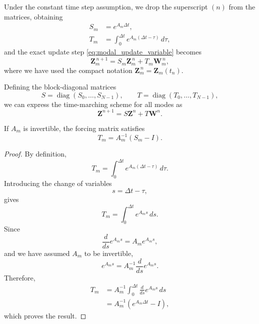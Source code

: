 \documentclass{Configuration_Files/PoliMi3i_thesis}
\begin{document}
Under the constant time step assumption, we drop the superscript $(n)$ from the matrices, obtaining
\begin{align}
S_m
&=
e^{A_m\Delta t}, \label{eq:Sm_def}
\\
T_m
&=
\int_0^{\Delta t}
e^{A_m(\Delta t-\tau)}
\,d\tau, \label{eq:Tm_def}
\end{align}
and the exact update step \eqref{eq:modal_update_variable} becomes
\begin{equation} \label{eq:modal_update}
\mathbf Z_m^{\,n+1}
=
S_m
\mathbf Z_m^{\,n}
+
T_m
\mathbf W_m^{\,n},
\end{equation}
where we have used the compact notation $\mathbf Z_m^{\,n} = \mathbf Z_m(t_n)$.

Defining the block-diagonal matrices
\begin{equation*}
S
=
\operatorname{diag}
(S_0,\ldots,S_{N-1}),
\qquad
T
=
\operatorname{diag}
(T_0,\ldots,T_{N-1}),
\end{equation*}
we can express the time-marching scheme for all modes as
\begin{equation} \label{eq:all_modal_update}
\mathbf Z^{n+1}
=
S\mathbf Z^n
+
T\mathbf W^n.
\end{equation}

\begin{proposition} \label{prop:Tmatrix}
If $A_m$ is invertible, the forcing matrix satisfies
\begin{equation*}
T_m
=
A_m^{-1}(S_m-I).
\end{equation*}
\end{proposition}

\begin{proof}
By definition,
\begin{equation*}
T_m
=
\int_0^{\Delta t}
e^{A_m(\Delta t-\tau)}
\,d\tau.
\end{equation*}
Introducing the change of variables
\begin{equation*}
s=\Delta t-\tau,
\end{equation*}
gives
\begin{equation*}
T_m
=
\int_0^{\Delta t}
e^{A_ms}\,ds.
\end{equation*}
Since
\begin{equation*}
\frac{d}{ds}e^{A_ms}
=
A_me^{A_ms},
\end{equation*}
and we have assumed $A_m$ to be invertible,
\begin{equation*}
e^{A_ms}
=
A_m^{-1}
\frac{d}{ds}
e^{A_ms}.
\end{equation*}
Therefore,
\begin{align*}
T_m
&=
A_m^{-1}
\int_0^{\Delta t}
\frac{d}{ds}
e^{A_ms}\,ds\\
&=
A_m^{-1}
\left(
e^{A_m\Delta t}-I
\right),
\end{align*}
which proves the result.
\end{proof}
\end{document}
